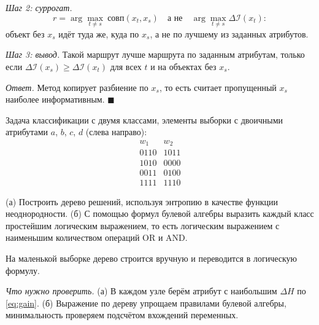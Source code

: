 \documentclass[12pt,a4paper]{article}
\begin{document}
\emph{Шаг 2: суррогат.}
\[
  r = \arg\max_{t \ne s}\ \text{совп}(x_t, x_s)
  \quad\text{а не}\quad
  \arg\max_{t \ne s}\Delta\mathcal{I}(x_t):
\]
объект без $x_s$ идёт туда же, куда по $x_s$, а не по лучшему из заданных атрибутов.

\emph{Шаг 3: вывод.} Такой маршрут лучше маршрута по заданным атрибутам, только если
$\Delta\mathcal{I}(x_s) \ge \Delta\mathcal{I}(x_t)$ для всех $t$ и на объектах без
$x_s$.

\emph{Ответ.} Метод копирует разбиение по $x_s$, то есть считает пропущенный $x_s$
наиболее информативным. $\blacksquare$

\dano Задача классификации с двумя классами, элементы выборки с двоичными
атрибутами $a$, $b$, $c$, $d$ (слева направо):
\[
\begin{array}{cc}
 w_1 & w_2 \\
 0110 & 1011 \\
 1010 & 0000 \\
 0011 & 0100 \\
 1111 & 1110
\end{array}
\]

\treb (а) Построить дерево решений, используя энтропию в качестве функции
неоднородности. (б) С помощью формул булевой алгебры выразить каждый класс
простейшим логическим выражением, то есть логическим выражением с наименьшим
количеством операций OR и AND.

\zachem На маленькой выборке дерево строится вручную и переводится в логическую
формулу.

\resh \emph{Что нужно проверить.} (а) В каждом узле берём атрибут с наибольшим
$\Delta H$ по \eqref{eq:gain}. (б) Выражение по дереву упрощаем правилами булевой
алгебры, минимальность проверяем подсчётом вхождений переменных.
\end{document}
